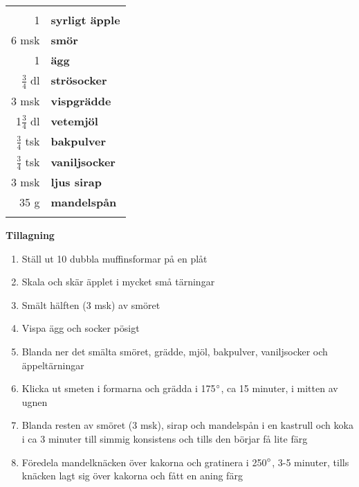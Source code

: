 \begin{table}[H]
	\begin{tabular}{rl}
	\hline
	&\\
		1 & \textbf{syrligt äpple}\\
		6 msk & \textbf{smör}\\
		1 & \textbf{ägg}\\
		$\frac{3}{4}$ dl & \textbf{strösocker}\\
		3 msk & \textbf{vispgrädde}\\
		1$\frac{3}{4}$ dl & \textbf{vetemjöl}\\
		$\frac{3}{4}$ tsk & \textbf{bakpulver}\\
		$\frac{3}{4}$ tsk & \textbf{vaniljsocker}\\
		3 msk & \textbf{ljus sirap}\\
		35 g & \textbf{mandelspån}\\
	&\\
	\hline
	\end{tabular}
\end{table}


\begin{multicols*}{2}

\noindent \textbf{Tillagning}
\begin{enumerate}
	\itemsep0cm
	\item Ställ ut 10 dubbla muffins\-formar på en plåt
	\item Skala och skär äpplet i mycket små tärningar
	\item Smält hälften (3 msk) av \mbox{smöret}
	\item Vispa ägg och socker pösigt
	\item Blanda ner det smälta smöret, grädde, mjöl, bakpulver, vaniljsocker och äppeltärningar
	\item Klicka ut smeten i formarna och grädda i 175$\degree$, ca 15 minuter, i mitten av ugnen
	\item Blanda resten av smöret (3 msk), sirap och mandelspån i en kastrull och koka i ca 3 minuter till simmig konsistens och tills den börjar få lite färg
	\item Föredela mandelknäcken över kakorna och gratinera i 250$\degree$, \mbox{3-5} minuter, tills knäcken lagt sig över kakorna och fått en aning färg
\end{enumerate}

\end{multicols*}

